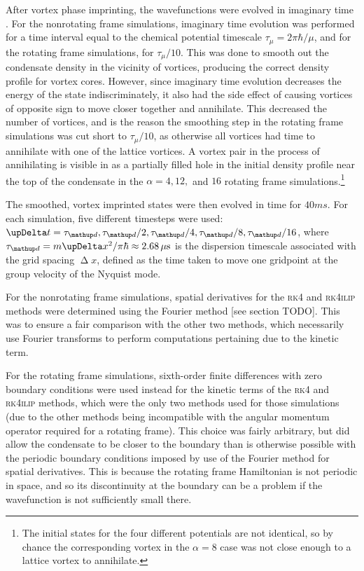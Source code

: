 After vortex phase imprinting, the wavefunctions were evolved in imaginary time \cite{chiofalo2000}. For the nonrotating frame simulations, imaginary time evolution was performed for a time interval equal to the chemical potential timescale $\tau_\mu= 2\pi\hbar/\mu$, and for the rotating frame simulations, for $\tau_\mu/10$. This was done to smooth out the condensate density in the vicinity of vortices, producing the correct density profile for vortex cores. However, since imaginary time evolution decreases the energy of the state indiscriminately, it also had the side effect of causing vortices of opposite sign to move closer together and annihilate. This decreased the number of vortices, and is the reason the smoothing step in the rotating frame simulations was cut short to $\tau_\mu/10$, as otherwise all vortices had time to annihilate with one of the lattice vortices. A vortex pair in the process of annihilating is visible in  as a partially filled hole in the initial density profile near the top of the condensate in the $\alpha=4, 12,$ and $16$ rotating frame simulations.\footnote{The initial states for the four different potentials are not identical, so by chance the corresponding vortex in the $\alpha=8$ case was not close enough to a lattice vortex to annihilate.}

The smoothed, vortex imprinted states were then evolved in time for $40\unit{ms}$. For each simulation, five different timesteps were used: $\upDelta t = \tau_\up d, \tau_\up d / 2, \tau_\up d / 4, \tau_\up d / 8, \tau_\up d / 16$, where \mbox{$\tau_\up d = m \upDelta x^2 / \pi\hbar \approx 2.68\unit{\mu s}$} is the dispersion timescale associated with the grid spacing $\upDelta x$, defined as the time taken to move one gridpoint at the group velocity of the Nyquist mode.

For the nonrotating frame simulations, spatial derivatives for the \textsc{rk4} and \textsc{rk4ilip} methods were determined using the Fourier method [see section TODO]. This was to ensure a fair comparison with the other two methods, which necessarily use Fourier transforms to perform computations pertaining due to the kinetic term.

For the rotating frame simulations, sixth-order finite differences with zero boundary conditions were used instead for the kinetic terms of the \textsc{rk4} and \textsc{rk4ilip} methods, which were the only two methods used for those simulations (due to the other methods being incompatible with the angular momentum operator required for a rotating frame). This choice was fairly arbitrary, but did allow the condensate to be closer to the boundary than is otherwise possible with the periodic boundary conditions imposed by use of the Fourier method for spatial derivatives. This is because the rotating frame Hamiltonian is not periodic in space, and so its discontinuity at the boundary can be a problem if the wavefunction is not sufficiently small there.

